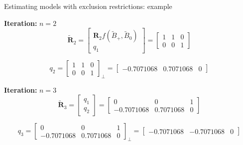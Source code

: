 \documentclass[notes,blackandwhite,mathsans,usenames,dvipsnames]{beamer}
\begin{document}
\begin{frame}{Estimating models with exclusion restrictions: example}

\textbf{Iteration:} $n=2$\small
$$\tilde{\mathbf{R}}_2 = \begin{bmatrix}\mathbf{R}_2f(\tilde{B}_+,\tilde{B}_0) \\ q_1\end{bmatrix} = \begin{bmatrix} 1&1&0\\0&0&1 \end{bmatrix}$$

$$ q_2 = \begin{bmatrix} 1&1&0\\0&0&1 \end{bmatrix}_{\bot} = \begin{bmatrix} -0.7071068&0.7071068&0 \end{bmatrix} $$

\normalsize\bigskip\textbf{Iteration:} $n=3$\small
$$\tilde{\mathbf{R}}_3 = \begin{bmatrix} q_1\\q_2\end{bmatrix} = \begin{bmatrix} 0&0&1 \\-0.7071068&0.7071068&0 \end{bmatrix}$$

$$ q_3 = \begin{bmatrix} 0&0&1 \\-0.7071068&0.7071068&0 \end{bmatrix}_{\bot} = \begin{bmatrix} -0.7071068&-0.7071068&0 \end{bmatrix} $$

\end{frame}
\end{document}
